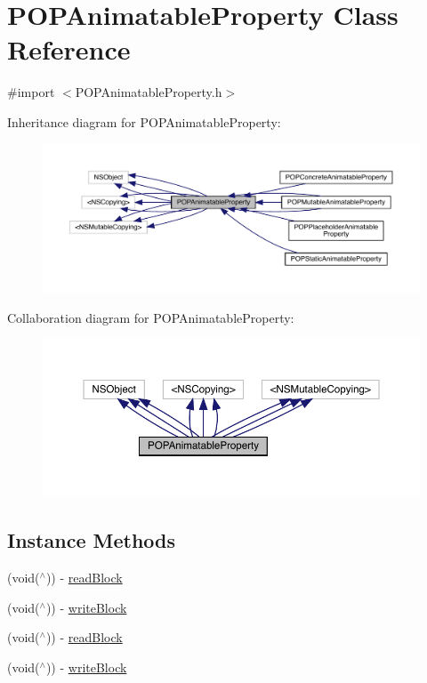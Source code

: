 \hypertarget{interface_p_o_p_animatable_property}{}\section{P\+O\+P\+Animatable\+Property Class Reference}
\label{interface_p_o_p_animatable_property}


{\ttfamily \#import $<$P\+O\+P\+Animatable\+Property.\+h$>$}



Inheritance diagram for P\+O\+P\+Animatable\+Property\+:\nopagebreak
\begin{figure}[H]
\begin{center}
\leavevmode
\includegraphics[width=350pt]{interface_p_o_p_animatable_property__inherit__graph}
\end{center}
\end{figure}


Collaboration diagram for P\+O\+P\+Animatable\+Property\+:\nopagebreak
\begin{figure}[H]
\begin{center}
\leavevmode
\includegraphics[width=350pt]{interface_p_o_p_animatable_property__coll__graph}
\end{center}
\end{figure}
\subsection*{Instance Methods}
\begin{DoxyCompactItemize}
\item 
(void($^\wedge$)) -\/ \mbox{\hyperlink{interface_p_o_p_animatable_property_a1b4363504a04cc556a6c80de5d4d7641}{read\+Block}}
\item 
(void($^\wedge$)) -\/ \mbox{\hyperlink{interface_p_o_p_animatable_property_a99ca8be7da49f05f0ee230a5bbc53df9}{write\+Block}}
\item 
(void($^\wedge$)) -\/ \mbox{\hyperlink{interface_p_o_p_animatable_property_a1b4363504a04cc556a6c80de5d4d7641}{read\+Block}}
\item 
(void($^\wedge$)) -\/ \mbox{\hyperlink{interface_p_o_p_animatable_property_a99ca8be7da49f05f0ee230a5bbc53df9}{write\+Block}}
\end{DoxyCompactItemize}
